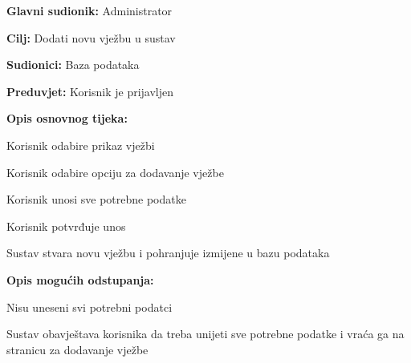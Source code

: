 					\noindent {}
					\begin{packed_item}
						
						\item \textbf{Glavni sudionik:} Administrator
						\item  \textbf{Cilj:} Dodati novu vježbu u sustav
						\item  \textbf{Sudionici:} Baza podataka
						\item  \textbf{Preduvjet:} Korisnik je prijavljen
						\item  \textbf{Opis osnovnog tijeka:}
						
						\item[] \begin{packed_enum}
							
							\item Korisnik odabire prikaz vježbi
							\item Korisnik odabire opciju za dodavanje vježbe
							\item Korisnik unosi sve potrebne podatke
							\item Korisnik potvrđuje unos
							\item Sustav stvara novu vježbu i pohranjuje izmijene u bazu podataka
							
						\end{packed_enum}
						
						\item  \textbf{Opis mogućih odstupanja:}
						
						\item[] \begin{packed_item}
							
							\item[4.a] Nisu uneseni svi potrebni podatci
							\item[] \begin{packed_enum}
								
								\item Sustav obavještava korisnika da treba unijeti sve potrebne podatke i vraća ga na stranicu za dodavanje vježbe
								
							\end{packed_enum}
							
						\end{packed_item}	
						
					\end{packed_item}
					
